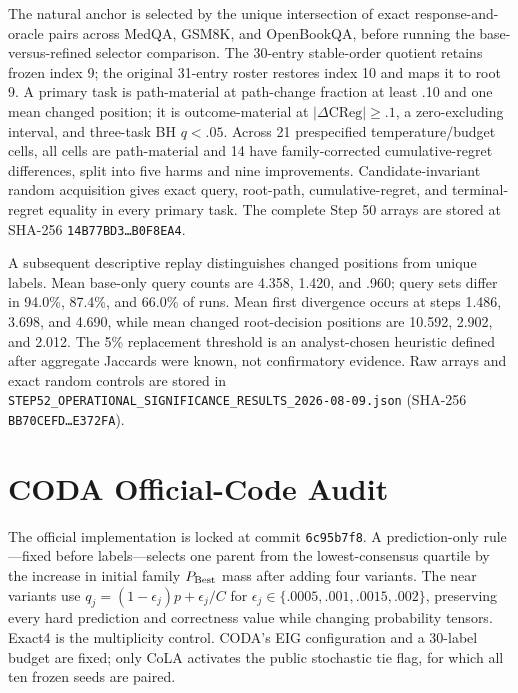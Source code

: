 The natural anchor is selected by the unique intersection of exact response-and-oracle pairs across MedQA, GSM8K, and OpenBookQA, before running the base-versus-refined selector comparison. The 30-entry stable-order quotient retains frozen index 9; the original 31-entry roster restores index 10 and maps it to root 9. A primary task is path-material at path-change fraction at least .10 and one mean changed position; it is outcome-material at $|\Delta\mathrm{CReg}|\geq.1$, a zero-excluding interval, and three-task BH $q<.05$. Across 21 prespecified temperature/budget cells, all cells are path-material and 14 have family-corrected cumulative-regret differences, split into five harms and nine improvements. Candidate-invariant random acquisition gives exact query, root-path, cumulative-regret, and terminal-regret equality in every primary task. The complete Step 50 arrays are stored at SHA-256 \texttt{14B77BD3\ldots B0F8EA4}.

A subsequent descriptive replay distinguishes changed positions from unique labels. Mean base-only query counts are 4.358, 1.420, and .960; query sets differ in 94.0\%, 87.4\%, and 66.0\% of runs. Mean first divergence occurs at steps 1.486, 3.698, and 4.690, while mean changed root-decision positions are 10.592, 2.902, and 2.012. The 5\% replacement threshold is an analyst-chosen heuristic defined after aggregate Jaccards were known, not confirmatory evidence. Raw arrays and exact random controls are stored in \texttt{STEP52\_OPERATIONAL\_SIGNIFICANCE\_RESULTS\_2026-08-09.json} (SHA-256 \texttt{BB70CEFD\ldots E372FA}).

\section{CODA Official-Code Audit}
\label{app:coda}

The official implementation is locked at commit \texttt{6c95b7f8}. A prediction-only rule---fixed before labels---selects one parent from the lowest-consensus quartile by the increase in initial family $P_{\rm Best}$ mass after adding four variants. The near variants use $q_j=(1-\epsilon_j)p+\epsilon_j/C$ for $\epsilon_j\in\{.0005,.001,.0015,.002\}$, preserving every hard prediction and correctness value while changing probability tensors. Exact4 is the multiplicity control. CODA's EIG configuration and a 30-label budget are fixed; only CoLA activates the public stochastic tie flag, for which all ten frozen seeds are paired.



